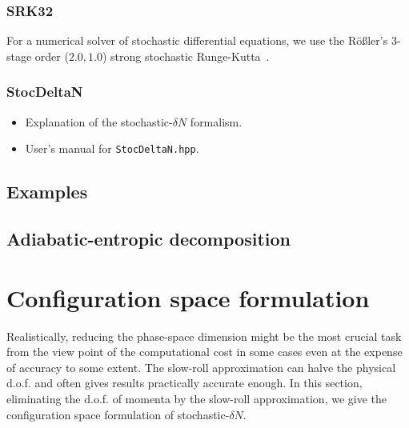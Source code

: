\documentclass[aps, prd
, preprint
, nofootinbib 
, longbibliography
]{revtex4-1}
\begin{document}
\subsubsection{SRK32}

For a numerical solver of stochastic differential equations, we use the R\"o\ss ler's 3-stage order ($2.0,1.0$) strong stochastic Runge-Kutta~\cite{rossler2010runge}.





\subsubsection{StocDeltaN}

\begin{itemize}
\item Explanation of the stochastic-$\delta N$ formalism.
\item User's manual for \texttt{StocDeltaN.hpp}.
\end{itemize}



\subsection{Examples}


\subsection{Adiabatic-entropic decomposition}\label{sec: Adiabatic-entropic decomposition}



\section{Configuration space formulation}

Realistically, reducing the phase-space dimension might be the most crucial task from the view point of the computational cost in some cases 
even at the expense of accuracy to some extent. The slow-roll approximation can halve the physical d.o.f. and often gives results practically accurate enough.
In this section, eliminating the d.o.f. of momenta by the slow-roll approximation, we give the configuration space formulation of stochastic-$\delta N$.
\end{document}
